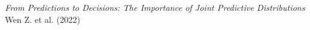 \documentclass[preview]{standalone}
\begin{document}
\begin{center}
\textit{From Predictions to Decisions: The Importance of Joint Predictive Distributions}\\Wen Z. et al. (2022)
\end{center}
\end{document}
